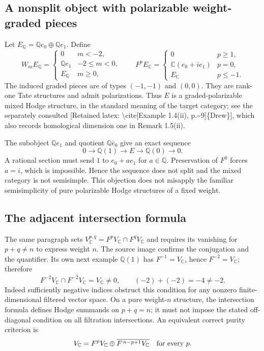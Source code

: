 \documentclass[10pt]{article}
\begin{document}
\subsection*{A nonsplit object with polarizable weight-graded pieces}
Let \(E_\mathbb Q=\mathbb Qe_0\oplus\mathbb Qe_1\). Define \[W_mE_\mathbb Q=\begin{cases}
 0&m<-2,\\ \mathbb Qe_1&-2\le m<0,\\ E_\mathbb Q&m\ge0,
 \end{cases}
 \qquad
 F^pE_\mathbb C=\begin{cases}
 0&p\ge1,\\
 \mathbb C(e_0+i e_1)&p=0,\\
 E_\mathbb C&p\le-1 .
 \end{cases}\] The induced graded pieces are of types \((-1,-1)\) and \((0,0)\). They are rank-one Tate structures and admit polarizations. Thus \(E\) is a graded-polarizable mixed Hodge structure, in the standard meaning of the target category; see the separately consulted [Retained latex: \textbackslash{}cite[Example 1.4(ii), p.\textasciitilde{}9]\{Drew\}], which also records homological dimension one in Remark 1.5(ii).\par
The subobject \(\mathbb Qe_1\) and quotient \(\mathbb Q\bar e_0\) give an exact sequence \[0\longrightarrow\mathbb Q(1)\longrightarrow E\longrightarrow\mathbb Q(0)
 \longrightarrow0.\] A rational section must send \(1\) to \(e_0+a e_1\) for \(a\in\mathbb Q\). Preservation of \(F^0\) forces \(a=i\), which is impossible. Hence the sequence does not split and the mixed category is not semisimple. This objection does not misapply the familiar semisimplicity of pure polarizable Hodge structures of a fixed weight.\par
\subsection*{The adjacent intersection formula}
The same paragraph sets \(V_\mathbb C^{p,q}=F^pV_\mathbb C\cap\overline{F^qV_\mathbb C}\) and requires its vanishing for \(p+q\ne n\) to express weight \(n\). The source image confirms the conjugation and the quantifier. Its own next example \(\mathbb Q(1)\) has \(F^{-1}=V_\mathbb C\), hence \(F^{-2}=V_\mathbb C\); therefore \[F^{-2}V_\mathbb C\cap\overline{F^{-2}V_\mathbb C}=V_\mathbb C\ne0,\qquad
 (-2)+(-2)=-4\ne-2.\] Indeed sufficiently negative indices obstruct this condition for any nonzero finite-dimensional filtered vector space. On a pure weight-\(n\) structure, the intersection formula defines Hodge summands on \(p+q=n\); it must not impose the stated off-diagonal condition on all filtration intersections. An equivalent correct purity criterion is \[V_\mathbb C=F^pV_\mathbb C\oplus\overline{F^{\,n-p+1}V_\mathbb C}
 \quad\hbox{for every }p .\]\par
\end{document}
